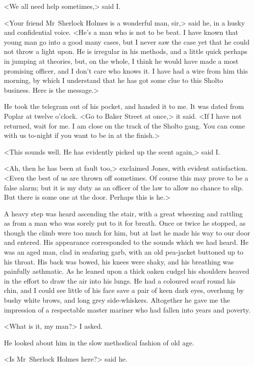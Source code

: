 <We all need help sometimes,> said I\@.

<Your friend Mr~Sherlock Holmes is a wonderful man, sir,> said he, in a husky and confidential voice. <He's a man who is not to be beat. I have known that young man go into a good many cases, but I never saw the case yet that he could not throw a light upon. He is irregular in his methods, and a little quick perhaps in jumping at theories, but, on the whole, I think he would have made a most promising officer, and I don't care who knows it. I have had a wire from him this morning, by which I understand that he has got some clue to this Sholto business. Here is the message.>

He took the telegram out of his pocket, and handed it to me. It was dated from Poplar at twelve o'clock. <Go to Baker Street at once,> it said. <If I have not returned, wait for me. I am close on the track of the Sholto gang. You can come with us to-night if you want to be in at the finish.>

<This sounds well. He has evidently picked up the scent again,> said I\@.

<Ah, then he has been at fault too,> exclaimed Jones, with evident satisfaction. <Even the best of us are thrown off sometimes. Of course this may prove to be a false alarm; but it is my duty as an officer of the law to allow no chance to slip. But there is some one at the door. Perhaps this is he.>

A heavy step was heard ascending the stair, with a great wheezing and rattling as from a man who was sorely put to it for breath. Once or twice he stopped, as though the climb were too much for him, but at last he made his way to our door and entered. His appearance corresponded to the sounds which we had heard. He was an aged man, clad in seafaring garb, with an old pea-jacket buttoned up to his throat. His back was bowed, his knees were shaky, and his breathing was painfully asthmatic. As he leaned upon a thick oaken cudgel his shoulders heaved in the effort to draw the air into his lungs. He had a coloured scarf round his chin, and I could see little of his face save a pair of keen dark eyes, overhung by bushy white brows, and long grey side-whiskers. Altogether he gave me the impression of a respectable master mariner who had fallen into years and poverty.

<What is it, my man?> I asked.

He looked about him in the slow methodical fashion of old age.

<Is Mr~Sherlock Holmes here?> said he.

